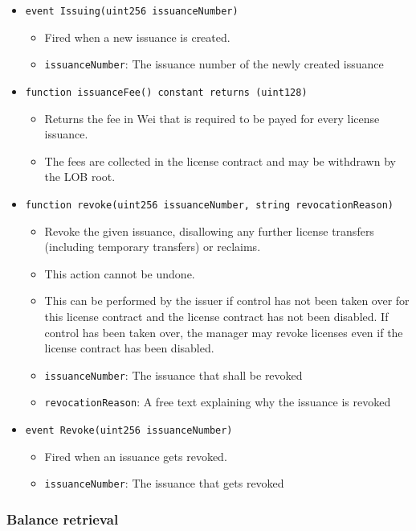 \documentclass[a4paper]{article}
\begin{document}
\begin{itemize}
  \item \texttt{event Issuing(uint256 issuanceNumber)}
  \begin{itemize}
    \item Fired when a new issuance is created.
    \item \texttt{issuanceNumber}: The issuance number of the newly created issuance
  \end{itemize}
  
  \item \texttt{function issuanceFee() constant returns (uint128)}
  \begin{itemize}
    \item Returns the fee in Wei that is required to be payed for every license issuance.
    \item The fees are collected in the license contract and may be withdrawn by the LOB root.
  \end{itemize}
  
  \item \texttt{function revoke(uint256 issuanceNumber, string revocationReason)}
  \begin{itemize}
    \item Revoke the given issuance, disallowing any further license transfers (including temporary transfers) or reclaims. 
    \item This action cannot be undone.
    \item This can be performed by the issuer if control has not been taken over for this license contract and the license contract has not been disabled. If control has been taken over, the manager may revoke licenses even if the license contract has been disabled.
    \item \texttt{issuanceNumber}: The issuance that shall be revoked
    \item \texttt{revocationReason}: A free text explaining why the issuance is revoked
  \end{itemize}
  
  \item \texttt{event Revoke(uint256 issuanceNumber)}
  \begin{itemize}
    \item Fired when an issuance gets revoked.
    \item \texttt{issuanceNumber}: The issuance that gets revoked
  \end{itemize}
\end{itemize}

\subsubsection{Balance retrieval}
\end{document}
